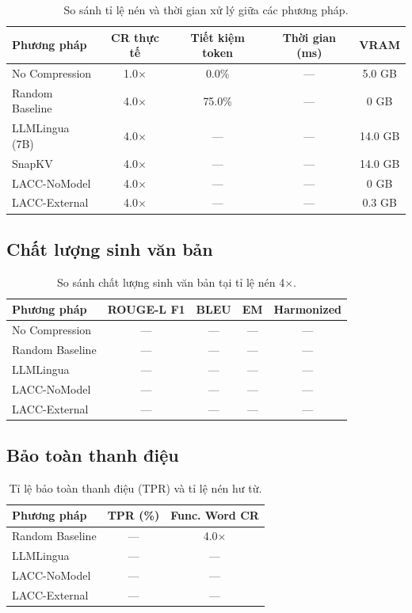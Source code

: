 \documentclass[12pt,a4paper]{article}
\begin{document}
\begin{table}[H]
\centering
\caption{So sánh tỉ lệ nén và thời gian xử lý giữa các phương pháp.}
\label{tab:compression_efficiency}
\begin{tabular}{lcccc}
\toprule
\textbf{Phương pháp} & \textbf{CR thực tế} & \textbf{Tiết kiệm token} & \textbf{Thời gian (ms)} & \textbf{VRAM} \\
\midrule
No Compression & 1.0$\times$ & 0.0\% & --- & 5.0 GB \\
Random Baseline & 4.0$\times$ & 75.0\% & --- & 0 GB \\
LLMLingua (7B) & 4.0$\times$ & --- & --- & 14.0 GB \\
SnapKV & 4.0$\times$ & --- & --- & 14.0 GB \\
LACC-NoModel & 4.0$\times$ & --- & --- & 0 GB \\
LACC-External & 4.0$\times$ & --- & --- & 0.3 GB \\
\bottomrule
\end{tabular}
\end{table}

\subsection{Chất lượng sinh văn bản}

\begin{table}[H]
\centering
\caption{So sánh chất lượng sinh văn bản tại tỉ lệ nén 4$\times$.}
\label{tab:quality}
\begin{tabular}{lcccc}
\toprule
\textbf{Phương pháp} & \textbf{ROUGE-L F1} & \textbf{BLEU} & \textbf{EM} & \textbf{Harmonized} \\
\midrule
No Compression & --- & --- & --- & --- \\
Random Baseline & --- & --- & --- & --- \\
LLMLingua & --- & --- & --- & --- \\
LACC-NoModel & --- & --- & --- & --- \\
LACC-External & --- & --- & --- & --- \\
\bottomrule
\end{tabular}
\end{table}

\subsection{Bảo toàn thanh điệu}

\begin{table}[H]
\centering
\caption{Tỉ lệ bảo toàn thanh điệu (TPR) và tỉ lệ nén hư từ.}
\label{tab:tone_preservation}
\begin{tabular}{lcc}
\toprule
\textbf{Phương pháp} & \textbf{TPR (\%)} & \textbf{Func. Word CR} \\
\midrule
Random Baseline & --- & 4.0$\times$ \\
LLMLingua & --- & --- \\
LACC-NoModel & --- & --- \\
LACC-External & --- & --- \\
\bottomrule
\end{tabular}
\end{table}
\end{document}

